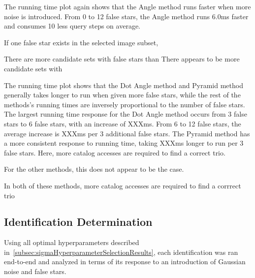 The running time plot again shows that the Angle method runs faster when more noise is introduced.
From 0 to 12 false stars, the Angle method runs 6.0ms faster and consumes 10 less query steps on average.

If one false star exists in the selected image subset,

There are more candidate sets with false stars than
There appears to be more candidate sets with

The running time plot shows that the Dot Angle method and Pyramid method generally takes longer to run when given more
false stars, while the rest of the methods's running times are inversely proportional to the number of false stars.
The largest running time response for the Dot Angle method occurs from 3 false stars to 6 false stars, with an increase
of XXXms.
From 6 to 12 false stars, the average increase is XXXms per 3 additional false stars.
The Pyramid method has a more consistent response to running time, taking XXXms longer to run per 3 false stars.
Here, more catalog accesses are required to find a correct trio.

For the other methods, this does not appear to be the case.

In both of these methods, more catalog accesses are required to find a corrrect trio

\subsection{Identification Determination}\label{subsec:identificationDeterminationResults}
Using all optimal hyperparameters described in~\autoref{subsec:sigmaHyperparameterSelectionResults}, each identification
was ran end-to-end and analyzed in terms of its response to an introduction of Gaussian noise and false stars.

\begin{figure}
\end{figure}

